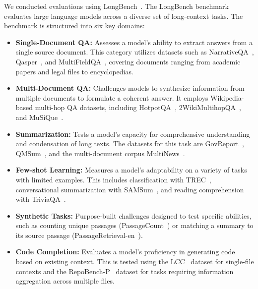 We conducted evaluations using LongBench~\citep{bai2023longbench}.
The LongBench benchmark \citep{bai2023longbench} evaluates large language models across a diverse set of long-context tasks. The benchmark is structured into six key domains:
\begin{itemize}
    \item \textbf{Single-Document QA:} Assesses a model's ability to extract answers from a single source document. This category utilizes datasets such as NarrativeQA~\citep{kovcisky2018narrativeqa}, Qasper~\citep{dasigi2021dataset}, and MultiFieldQA~\citep{bai2023longbench}, covering documents ranging from academic papers and legal files to encyclopedias.

    \item \textbf{Multi-Document QA:} Challenges models to synthesize information from multiple documents to formulate a coherent answer. It employs Wikipedia-based multi-hop QA datasets, including HotpotQA~\citep{yang2018hotpotqa}, 2WikiMultihopQA~\citep{ho2020constructing}, and MuSiQue~\citep{trivedi2022musique}.

    \item \textbf{Summarization:} Tests a model's capacity for comprehensive understanding and condensation of long texts. The datasets for this task are GovReport~\citep{huang2021efficient}, QMSum~\citep{zhong2021qmsum}, and the multi-document corpus MultiNews~\citep{fabbri2019multi}.

    \item \textbf{Few-shot Learning:} Measures a model's adaptability on a variety of tasks with limited examples. This includes classification with TREC~\citep{li2002learning}, conversational summarization with SAMSum~\citep{gliwa2019samsum}, and reading comprehension with TriviaQA~\citep{joshi2017triviaqa}.
    
    \item \textbf{Synthetic Tasks:} Purpose-built challenges designed to test specific abilities, such as counting unique passages (PassageCount~\citep{bai2023longbench}) or matching a summary to its source passage (PassageRetrieval-en~\citep{raffel2020exploring}).

    \item \textbf{Code Completion:} Evaluates a model's proficiency in generating code based on existing context. This is tested using the LCC~\citep{guo2023longcoder} dataset for single-file contexts and the RepoBench-P~\citep{liu2023repobench} dataset for tasks requiring information aggregation across multiple files.
\end{itemize}



